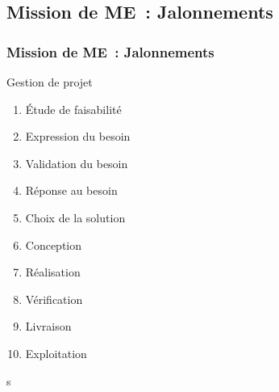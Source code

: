 \subsection{Mission de ME~: Jalonnements}
\begin{frame}
	\frametitle{Mission de ME~: Jalonnements}
\end{frame}

\begin{frame}
	\centering
	\begin{block}{Gestion de projet}
	\begin{enumerate}
		\item Étude de faisabilité\pause
		\item Expression du besoin\pause
		\item Validation du besoin\pause
		\item Réponse au besoin\pause
		\item Choix de la solution\pause
		\item Conception\pause
		\item Réalisation\pause
		\item Vérification\pause
		\item Livraison\pause
		\item Exploitation\pause
	\end{enumerate}
	\end{block}
\end{frame}
s